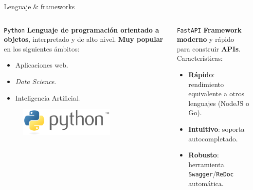 \documentclass[aspectratio=169,xcolor=dvipsnames]{beamer}
\begin{document}
	
	\begin{frame}{Lenguaje \& frameworks}
		\begin{columns}
			\begin{column}{0.5\textwidth}
				\begin{exampleblock}{\texttt{Python}}
					\textbf{Lenguaje de programación orientado a objetos}, interpretado y de alto nivel. \textbf{Muy popular} en los siguientes ámbitos:
					
					\begin{itemize}
						\item Aplicaciones web.
						
						\item \textit{Data Science}.
						
						\item Inteligencia Artificial.
					\end{itemize}
					
					\begin{figure}[h!]
						\begin{center}
							\includegraphics[width=0.7\textwidth]{img/python_logo.png}
						\end{center}
					\end{figure}
				\end{exampleblock}
			\end{column}
		
			\begin{column}{0.5\textwidth}
				\begin{exampleblock}{\texttt{FastAPI}}
					\textbf{Framework moderno} y rápido para construir \textbf{APIs}. Características:
					
					\begin{itemize}
						\item \textbf{Rápido}: rendimiento equivalente a otros lenguajes (NodeJS o Go).
						\item \textbf{Intuitivo}: soporta autocompletado. 
						\item \textbf{Robusto}: herramienta \texttt{Swagger}/\texttt{ReDoc} automática.
					\end{itemize}
					

\end{exampleblock}
\end{column}
\end{columns}
\end{frame}
\end{document}
